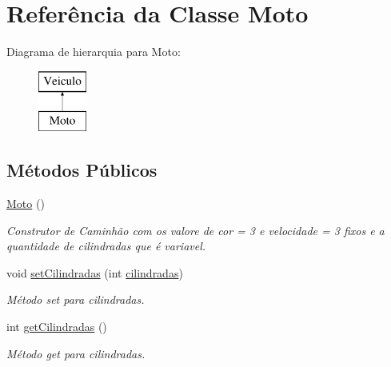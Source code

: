 \hypertarget{class_moto}{}\section{Referência da Classe Moto}
\label{class_moto}
Diagrama de hierarquia para Moto\+:\begin{figure}[H]
\begin{center}
\leavevmode
\includegraphics[height=2.000000cm]{class_moto}
\end{center}
\end{figure}
\subsection*{Métodos Públicos}
\begin{DoxyCompactItemize}
\item 
\mbox{\label{class_moto_af900d6c1d6b9a69fb6b8bdb0c3401603}} 
\mbox{\hyperlink{class_moto_af900d6c1d6b9a69fb6b8bdb0c3401603}{Moto}} ()
\begin{DoxyCompactList}\small\item\em Construtor de Caminhão com os valore de cor = 3 e velocidade = 3 fixos e a quantidade de cilindradas que é variavel. \end{DoxyCompactList}\item 
\mbox{\label{class_moto_ac379afd86f98c2def2e87b34abbe3f0c}} 
void \mbox{\hyperlink{class_moto_ac379afd86f98c2def2e87b34abbe3f0c}{set\+Cilindradas}} (int \mbox{\hyperlink{class_moto_ae62f5c23f1b1b77bbda2891971e0b169}{cilindradas}})
\begin{DoxyCompactList}\small\item\em Método set para cilindradas. \end{DoxyCompactList}\item 
\mbox{\label{class_moto_aceb2f04f9b41595a26c57963bc115c61}} 
int \mbox{\hyperlink{class_moto_aceb2f04f9b41595a26c57963bc115c61}{get\+Cilindradas}} ()
\begin{DoxyCompactList}\small\item\em Método get para cilindradas. \end{DoxyCompactList}\end{DoxyCompactItemize}
